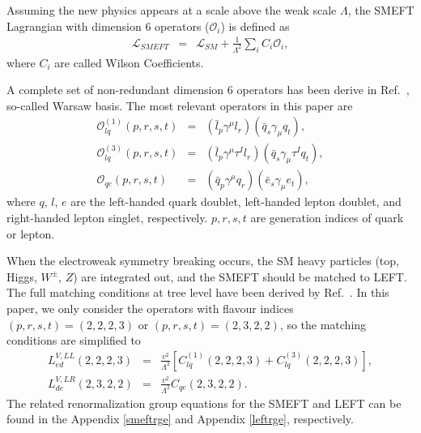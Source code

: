 \documentclass[a4paper,11pt]{article}
\begin{document}
Assuming the new physics appears at a scale above the weak scale $\Lambda$, 
the SMEFT Lagrangian with dimension 6 operators ($\mathcal{O}_i$) is defined as
\begin{eqnarray}
  \mathcal{L}_{SMEFT} &=& \mathcal{L}_{SM} + \frac{1}{\Lambda^2}\sum_{i}C_i\mathcal{O}_i,  
\end{eqnarray}
where $C_i$ are called Wilson Coefficients.

A complete set of non-redundant dimension 6 operators has been derive in Ref.~\cite{Grzadkowski:2010es}, so-called Warsaw basis. 
The most relevant operators in this paper are
\begin{eqnarray}
   \mathcal{O}^{(1)}_{lq}(p,r,s,t) &=& (\bar{l}_p\gamma^\mu l_r)(\bar{q}_s\gamma_\mu q_{t}),  \label{O1lq} \\
   \mathcal{O}^{(3)}_{lq}(p,r,s,t) &=& (\bar{l}_p\gamma^\mu\tau^I l_r)(\bar{q}_s\gamma_\mu\tau^I q_{t}),  \label{O3lq} \\
   \mathcal{O}_{qe}(p,r,s,t) &=& (\bar{q}_p\gamma^\mu q_r)(\bar{e}_s\gamma_\mu e_t), \label{Oqe}
\end{eqnarray}
where $q$, $l$, $e$ are the left-handed quark doublet, left-handed lepton doublet, and right-handed lepton singlet, respectively. 
$p,r,s,t$ are generation indices of quark or lepton.

When the electroweak symmetry breaking occurs, the SM heavy particles (top, Higgs,  $W^\pm$,  $Z$) are integrated out, and the SMEFT should be matched to LEFT. 
The full matching conditions at tree level have been derived by Ref.~\cite{Jenkins:2017jig}.
In this paper, we only consider the operators with flavour indices $(p,r,s,t)=(2,2,2,3)$ or $(p,r,s,t)=(2,3,2,2)$, so the matching conditions are simplified to 
\begin{eqnarray}
    L^{V,LL}_{ed}(2,2,2,3) &=& \frac{v^2}{\Lambda^2}\left[C^{(1)}_{lq}(2,2,2,3)+C^{(3)}_{lq}(2,2,2,3)\right],  \label{match:VLLed}\\
    L^{V,LR}_{de}(2,3,2,2)&=& \frac{v^2}{\Lambda^2}C_{qe}(2,3,2,2). \label{match:VLRde}
\end{eqnarray}
The related renormalization group equations for the SMEFT and LEFT can be found in the Appendix \ref{smeftrge} and Appendix \ref{leftrge}, respectively.
\end{document}
